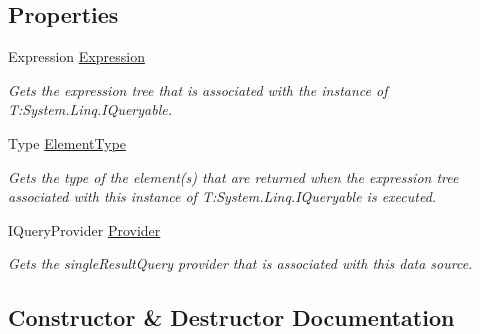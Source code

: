 \subsection*{Properties}
\begin{DoxyCompactItemize}
\item 
Expression \hyperlink{classCqrs_1_1DataStores_1_1InProcessDataStore_a459174c411a0df2b4ec1e48a3b36f884}{Expression}
\begin{DoxyCompactList}\small\item\em Gets the expression tree that is associated with the instance of T\+:\+System.\+Linq.\+I\+Queryable. \end{DoxyCompactList}\item 
Type \hyperlink{classCqrs_1_1DataStores_1_1InProcessDataStore_aacc8434efa0250be78dda57e159a5aa8}{Element\+Type}
\begin{DoxyCompactList}\small\item\em Gets the type of the element(s) that are returned when the expression tree associated with this instance of T\+:\+System.\+Linq.\+I\+Queryable is executed. \end{DoxyCompactList}\item 
I\+Query\+Provider \hyperlink{classCqrs_1_1DataStores_1_1InProcessDataStore_a9f4e487d52f69245266afdf303d585c1}{Provider}
\begin{DoxyCompactList}\small\item\em Gets the single\+Result\+Query provider that is associated with this data source. \end{DoxyCompactList}\end{DoxyCompactItemize}


\subsection{Constructor \& Destructor Documentation}
\mbox{\label{classCqrs_1_1DataStores_1_1InProcessDataStore_a86a0ef4945e0f2fa45027ceb3261d284}} 
